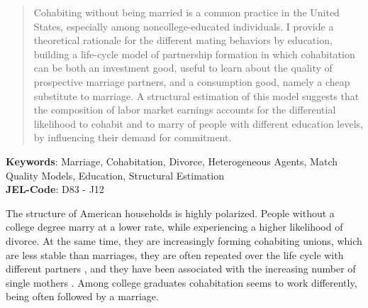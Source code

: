 \documentclass[12pt]{article}
\begin{document}

\begin{abstract}
	Cohabiting without being married is a common practice in the United States, especially among noncollege-educated individuals. I provide a theoretical rationale for the different mating behaviors by education, building a life-cycle model of partnership formation in which cohabitation can be both an investment good, useful to learn about the quality of prospective marriage partners, and a consumption good, namely a cheap substitute to marriage. A structural estimation of this model suggests that the composition of labor market earnings accounts for the differential likelihood to cohabit and to marry of people with different education levels, by influencing their demand for commitment.
\end{abstract}


\textbf{Keywords}: Marriage, Cohabitation, Divorce, Heterogeneous Agents, Match Quality Models, Education, Structural Estimation\\
\textbf{JEL-Code}: D83 - J12 
\clearpage

The structure of American households is highly polarized. People without a college degree marry at a lower rate, while experiencing a higher likelihood of divorce. At the same time, they are increasingly forming cohabiting unions, which are less stable than marriages, they are often repeated over the life cycle with different partners \citep{lichter2010}, and they have been associated with the increasing number of single mothers \citep{bumpass2000}. Among college graduates cohabitation seems to work differently, being often followed by a marriage.
\end{document}
